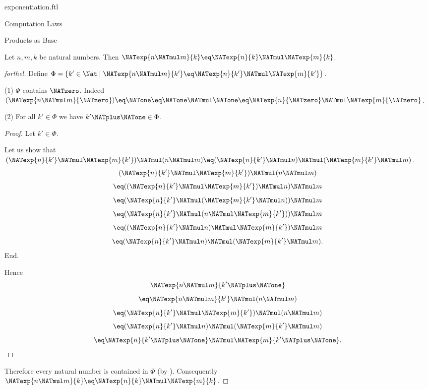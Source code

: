 \documentclass{naproche-library}
\begin{document}
\begin{smodule}[title=Exponentiation]{exponentiation.ftl}
\begin{sfragment}{Computation Laws}
  \begin{sfragment}{Products as Base}
    \begin{proposition}[forthel,id=ARITHMETIC_09_2563032276271104]
      Let $n, m, k$ be natural numbers.
      Then $\NATexp{n \NATmul m}{k} \eq \NATexp{n}{k} \NATmul \NATexp{m}{k}$.
    \end{proposition}
    \begin{proof}[forthel]
      Define $\Phi = \{ k' \in \Nat \mid \NATexp{n \NATmul m}{k'} \eq \NATexp{n}{k'} \NATmul \NATexp{m}{k'} \}$.

      (1) $\Phi$ contains $\NATzero$.
      Indeed $(\NATexp{n \NATmul m}{\NATzero})
        \eq \NATone
        \eq \NATone \NATmul \NATone
        \eq \NATexp{n}{\NATzero} \NATmul \NATexp{m}{\NATzero}$. %

      (2) For all $k' \in \Phi$ we have $k' \NATplus \NATone \in \Phi$.
      \begin{proof}
        Let $k' \in \Phi$.

        Let us show that $(\NATexp{n}{k'} \NATmul \NATexp{m}{k'}) \NATmul (n \NATmul m) \eq (\NATexp{n}{k'} \NATmul n) \NATmul (\NATexp{m}{k'} \NATmul m)$.
          \[  (\NATexp{n}{k'} \NATmul \NATexp{m}{k'}) \NATmul (n \NATmul m)       \]
          \[    \eq ((\NATexp{n}{k'} \NATmul \NATexp{m}{k'}) \NATmul n) \NATmul m   \]
          \[    \eq (\NATexp{n}{k'} \NATmul (\NATexp{m}{k'} \NATmul n)) \NATmul m   \]
          \[    \eq (\NATexp{n}{k'} \NATmul (n \NATmul \NATexp{m}{k'})) \NATmul m   \]
          \[    \eq ((\NATexp{n}{k'} \NATmul n) \NATmul \NATexp{m}{k'}) \NATmul m   \]
          \[    \eq (\NATexp{n}{k'} \NATmul n) \NATmul (\NATexp{m}{k'} \NATmul m).  \]
        End.

        Hence
        \[  \NATexp{n \NATmul m}{k' \NATplus \NATone}                          \]
        \[    \eq \NATexp{n \NATmul m}{k'} \NATmul (n \NATmul m)        \]
        \[    \eq (\NATexp{n}{k'} \NATmul \NATexp{m}{k'}) \NATmul (n \NATmul m)   \]
        \[    \eq (\NATexp{n}{k'} \NATmul n) \NATmul (\NATexp{m}{k'} \NATmul m)   \]
        \[    \eq \NATexp{n}{k' \NATplus \NATone} \NATmul \NATexp{m}{k' \NATplus \NATone}.              \]
      \end{proof}

      Therefore every natural number is contained in $\Phi$ (by ).
      Consequently $\NATexp{n \NATmul m}{k} \eq \NATexp{n}{k} \NATmul \NATexp{m}{k}$.
    \end{proof}
  \end{sfragment}


\end{sfragment}
\end{smodule}
\end{document}
